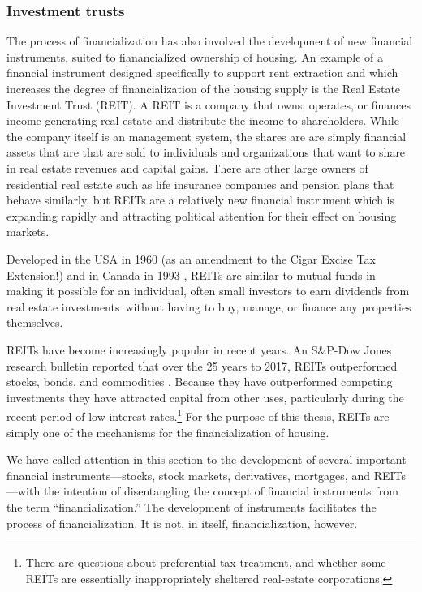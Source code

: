 \subsubsection{Investment trusts}
The process of financialization has also involved the development of new financial instruments, suited to fianancialized ownership of housing. An example of a financial instrument designed specifically to support rent extraction and which increases the degree of financialization of the housing supply is the Real Estate Investment Trust (\gls{REIT}). A REIT is a company that owns, operates, or finances income-generating real estate and distribute the income to shareholders. While the company itself is an management system, the shares are are simply financial assets that are that are sold to individuals and organizations that want to share in real estate revenues and capital gains. There are other large owners of residential real estate such as life insurance companies and pension plans that behave similarly, but REITs are a relatively new financial instrument which is  expanding rapidly and attracting political attention for their effect on housing markets.  %

Developed in the USA  in 1960 (as an amendment to the Cigar Excise Tax Extension!) and in Canada in 1993 \cite{GET_REITsDevelopedDates}, REITs are similar to mutual funds in making it possible for an individual, often small investors to earn dividends from real estate investments without having to buy, manage, or finance any properties themselves. 

REITs have become increasingly popular in recent years. An S\&P-Dow Jones research bulletin reported that over the  25 years to 2017, REITs outperformed stocks, bonds, and commodities \cite{GET-Dow-Jones-research-bulletin}. Because they have outperformed competing investments they have attracted  capital from other uses, particularly during the recent period of low interest rates.\footnote{There are questions about preferential tax treatment, and whether some REITs are essentially inappropriately sheltered real-estate corporations.} For the purpose of this thesis, REITs are simply one of the mechanisms for the financialization of housing.

We have called attention in this section to the development of several important financial instruments---stocks, stock markets, derivatives, mortgages, and REITs---with the intention of  disentangling the concept of financial instruments from the term ``financialization.'' The development of instruments facilitates the process of financialization. It is not, in itself, financialization, however.

